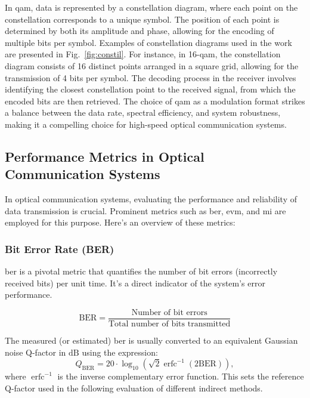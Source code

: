 In \acrshort{qam}, data is represented by a constellation diagram, where each point on the constellation corresponds to a unique symbol. The position of each point is determined by both its amplitude and phase, allowing for the encoding of multiple bits per symbol. Examples of constellation diagrams used in the work are presented in Fig.~\ref{fig:constil}. For instance, in 16-\acrshort{qam}, the constellation diagram consists of 16 distinct points arranged in a square grid, allowing for the transmission of 4 bits per symbol. The decoding process in the receiver involves identifying the closest constellation point to the received signal, from which the encoded bits are then retrieved. The choice of \acrshort{qam} as a modulation format strikes a balance between the data rate, spectral efficiency, and system robustness, making it a compelling choice for high-speed optical communication systems.

\subsection{Performance Metrics in Optical Communication Systems}


In optical communication systems, evaluating the performance and reliability of data transmission is crucial. Prominent metrics such as \gls{ber}, \gls{evm}, and \gls{mi} are employed for this purpose. Here's an overview of these metrics:

\subsubsection{Bit Error Rate (BER)}
\acrfull{ber} is a pivotal metric that quantifies the number of bit errors (incorrectly received bits) per unit time. It's a direct indicator of the system's error performance.

\begin{equation}
\text{BER} = \frac{\text{Number of bit errors}}{\text{Total number of bits transmitted}}
\end{equation}

The measured (or estimated) \acrshort{ber} is usually converted to an equivalent Gaussian noise Q-factor in $\mathrm{dB}$ using the expression:
\begin{equation}
Q_{\mathrm{BER}}=20 \cdot \log _{10}\left(\sqrt{2} \operatorname{erfc}^{-1}(2 \mathrm{BER})\right),
\end{equation}
where $\operatorname{erfc}^{-1}$ is the inverse complementary error function. This sets the reference Q-factor used in the following evaluation of different indirect methods.

